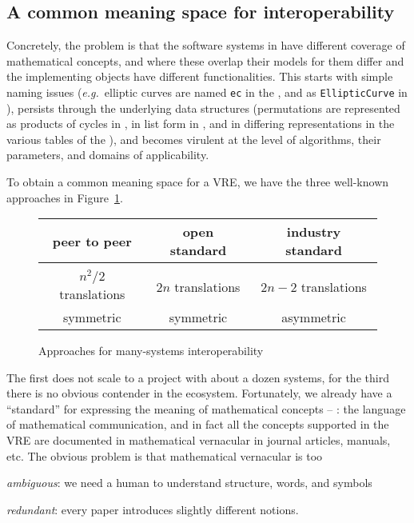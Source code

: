 \subsection{A common meaning space for interoperability}

Concretely, the problem is that the software systems in \ODK have different coverage of mathematical concepts, and
where these overlap their models for them differ and the implementing objects have different functionalities.
This starts with simple naming issues (\emph{e.g.}\ elliptic curves are named
\lstinline|ec| in the \LMFDB, and as \lstinline|EllipticCurve| in \Sage), persists through
the underlying data structures (permutations are represented as products of cycles in
\GAP, in list form in \Sage, and in differing representations in the various tables of the
\LMFDB), and becomes virulent at the level of algorithms, their parameters, and domains of
applicability.

To obtain a common meaning space for a VRE, we have the three well-known approaches in
Figure~\ref{fig:interop}.
\begin{figure}[ht]\centering
  \begin{tabular}{|c|c|c|}\hline
    peer to peer & open standard & industry standard\\\hline
     &  & \\\hline
    $n^2/2$  translations & $2n$ translations & $2n-2$ translations \\
    symmetric & symmetric & asymmetric\\\hline
  \end{tabular}
  \caption{Approaches for many-systems interoperability}\label{fig:interop}
\end{figure}

The first does not scale to a project with about a dozen systems, for the third there is
no obvious contender in the \ODK ecosystem. Fortunately, we already have a ``standard''
for expressing the meaning of mathematical concepts -- :
the language of mathematical communication, and in fact all the concepts supported in the
\ODK VRE are documented in mathematical vernacular in journal articles, manuals, etc.
The obvious problem is that mathematical vernacular is too
\begin{inparaenum}[\em i\rm)]
\item \emph{ambiguous}: we need a human to understand structure, words, and symbols
\item \emph{redundant}: every paper introduces slightly different notions. 
\end{inparaenum}


